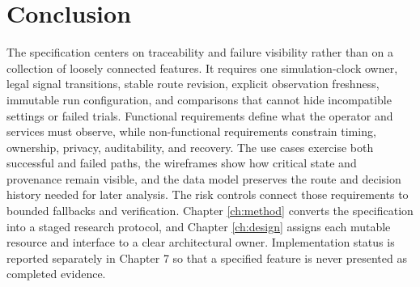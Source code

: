 \section{Conclusion}


The specification centers on traceability and failure visibility rather than on a collection of loosely connected features. It requires one simulation-clock owner, legal signal transitions, stable route revision, explicit observation freshness, immutable run configuration, and comparisons that cannot hide incompatible settings or failed trials. Functional requirements define what the operator and services must observe, while non-functional requirements constrain timing, ownership, privacy, auditability, and recovery. The use cases exercise both successful and failed paths, the wireframes show how critical state and provenance remain visible, and the data model preserves the route and decision history needed for later analysis. The risk controls connect those requirements to bounded fallbacks and verification. Chapter \ref{ch:method} converts the specification into a staged research protocol, and Chapter \ref{ch:design} assigns each mutable resource and interface to a clear architectural owner. Implementation status is reported separately in Chapter 7 so that a specified feature is never presented as completed evidence.
